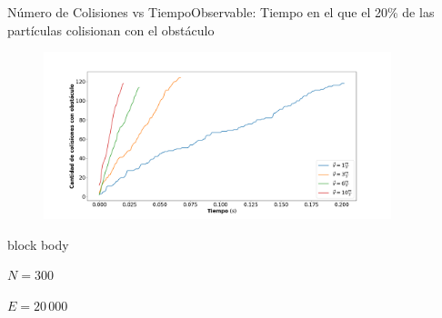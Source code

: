 \documentclass{beamer}
\begin{document}
            \begin{frame}{Número de Colisiones vs Tiempo}{Observable: Tiempo en el que el 20\% de las partículas colisionan con el obstáculo}
                \begin{figure}[H!]
                    \includegraphics[width=0.9\textwidth]{./unique_collisions_vs_time}
                    \label{fig:threshold_1}
                \end{figure}
                \begin{beamercolorbox}[sep=5pt,center]{block body}
                    \begin{minipage}[t]{0.45\textwidth}
                        \centering
                        \small{$N=300$}
                    \end{minipage}
                    \hfill
                    \begin{minipage}[t]{0.45\textwidth}
                        \centering
                        \small{$E=20\,000$}
                    \end{minipage}
                \end{beamercolorbox}
            \end{frame}
\end{document}
